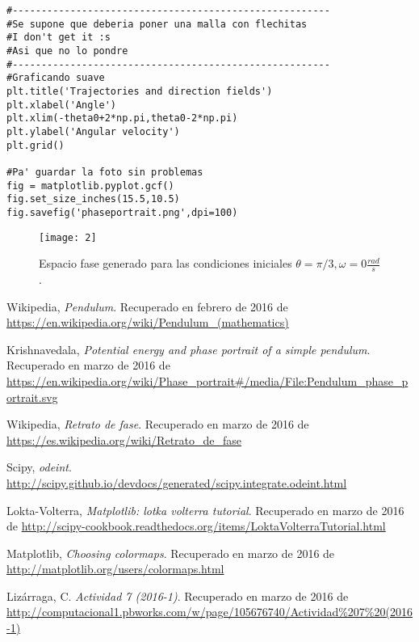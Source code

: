 \documentclass[12pt]{article}
\begin{document}
{\begin{verbatim}
#-------------------------------------------------------
#Se supone que deberia poner una malla con flechitas
#I don't get it :s
#Asi que no lo pondre
#-------------------------------------------------------
#Graficando suave
plt.title('Trajectories and direction fields')
plt.xlabel('Angle')
plt.xlim(-theta0+2*np.pi,theta0-2*np.pi)
plt.ylabel('Angular velocity')
plt.grid()

#Pa' guardar la foto sin problemas
fig = matplotlib.pyplot.gcf()
fig.set_size_inches(15.5,10.5)
fig.savefig('phaseportrait.png',dpi=100)
\end{verbatim}}

\begin{figure}[H]
\centering
\texttt{[image: 2]}
\caption{Espacio fase generado para las condiciones iniciales $\theta=\pi/3, \omega=0 \frac{rad}{s}$.}
\end{figure}

\pagebreak

\begin{thebibliography}{6}

Wikipedia,
\emph{Pendulum}. Recuperado en febrero de 2016 de \url{https://en.wikipedia.org/wiki/Pendulum\_(mathematics)}

Krishnavedala,
\emph{Potential energy and phase portrait of a simple pendulum}. Recuperado en marzo de 2016 de \url{https://en.wikipedia.org/wiki/Phase_portrait#/media/File:Pendulum_phase_portrait.svg}

Wikipedia,
\emph{Retrato de fase}. Recuperado en marzo de 2016 de \url{https://es.wikipedia.org/wiki/Retrato_de_fase}

Scipy,
\emph{odeint}. \url{http://scipy.github.io/devdocs/generated/scipy.integrate.odeint.html}

Lokta-Volterra,
\emph{Matplotlib: lotka volterra tutorial}. Recuperado en marzo de 2016 de \url{http://scipy-cookbook.readthedocs.org/items/LoktaVolterraTutorial.html}

Matplotlib,
\emph{Choosing colormaps}. Recuperado en marzo de 2016 de \url{http://matplotlib.org/users/colormaps.html}

Lizárraga, C.
\emph{Actividad 7 (2016-1)}. Recuperado en marzo de 2016 de \url{http://computacional1.pbworks.com/w/page/105676740/Actividad\%207\%20(2016-1)}

\end{thebibliography}
\end{document}
